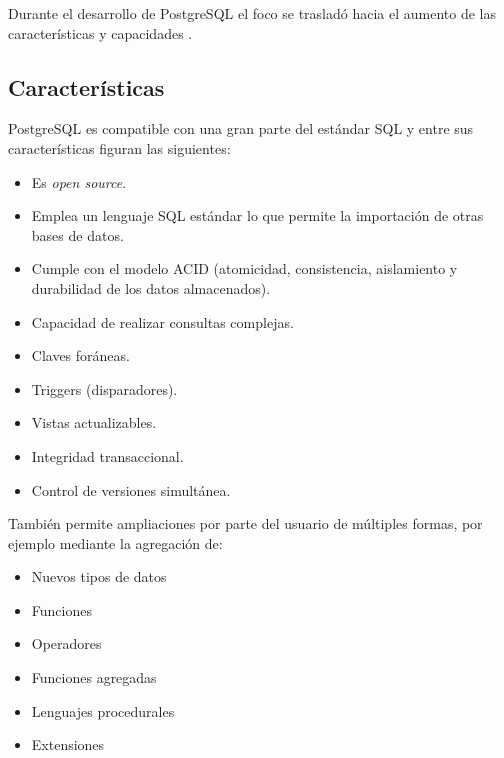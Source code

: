 Durante el desarrollo de PostgreSQL el foco se trasladó hacia el aumento de las características y capacidades .

\subsection{Características}
\label{sec:caracteristicas}

PostgreSQL es compatible con una gran parte del estándar SQL y entre sus características figuran las siguientes: 
\begin{itemize}
\item Es \textit{open source}.
\item Emplea un lenguaje SQL estándar lo que permite la importación de otras bases de datos.
\item Cumple con el modelo ACID (atomicidad, consistencia, aislamiento y durabilidad de los datos almacenados).
\item Capacidad de realizar consultas complejas.
\item Claves foráneas.
\item Triggers (disparadores).
\item Vistas actualizables.
\item Integridad transaccional.
\item Control de versiones simultánea.
\end{itemize}

También permite ampliaciones por parte del usuario de múltiples formas, por ejemplo mediante la agregación de:
\begin{itemize}
\item Nuevos tipos de datos 
\item Funciones 
\item Operadores 
\item Funciones agregadas 
\item Lenguajes procedurales 
\item Extensiones
\end{itemize}


